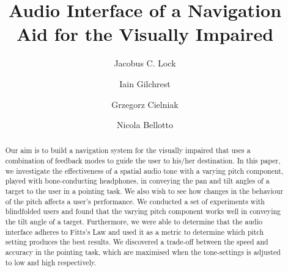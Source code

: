 \documentclass[format=sigconf, review=true, screen=true, anonymous=true]{acmart}
\begin{document}

\title[Audio Interface for the Visually Impaired]{Audio Interface of a Navigation Aid for the Visually Impaired}

\author{Jacobus C. Lock}

\author{Iain Gilchrest}

\author{Grzegorz Cielniak}

\author{Nicola Bellotto}




\begin{abstract}
	Our aim is to build a navigation system for the visually impaired that uses a combination of feedback modes to guide the user to his/her destination. In this paper, we investigate the effectiveness of a spatial audio tone with a varying pitch component, played with bone-conducting headphones, in conveying the pan and tilt angles of a target to the user in a pointing task. We also wish to see how changes in the behaviour of the pitch affects a user's performance. We conducted a set of experiments with blindfolded users and found that the varying pitch component works well in conveying the tilt angle of a target. Furthermore, we were able to determine that the audio interface adheres to Fitts's Law and used it as a metric to determine which pitch setting produces the best results. We discovered a trade-off between the speed and accuracy in the pointing task, which are maximised when the tone-settings is adjusted to low and high respectively. 
\end{abstract}
\end{document}
